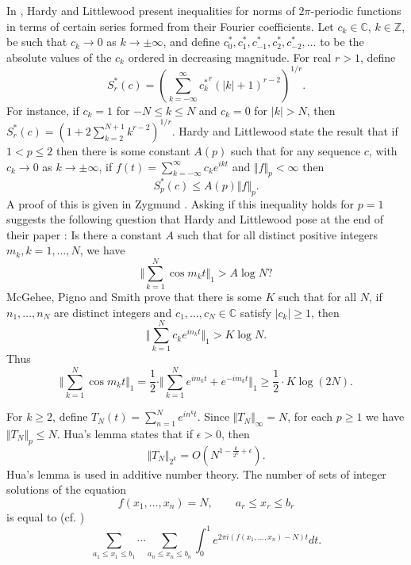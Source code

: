 \documentclass{article}
\newcommand{\norm}[1]{\Vert #1 \Vert}
\begin{document}
In \cite{MR0028445}, Hardy and Littlewood present inequalities for norms of $2\pi$-periodic functions in terms of certain series
formed from their Fourier coefficients. Let $c_k \in \mathbb{C}$, $k \in \mathbb{Z}$, be such that $c_k \to 0$ as $k \to \pm \infty$, and
define
  $c_0^*,c_1^*,c_{-1}^*,c_2^*,c_{-2}^*,\ldots$
to be the absolute values of the $c_k$ ordered in decreasing magnitude. For real $r>1$, define
\[
S_r^*(c)=\left( \sum_{k=-\infty}^\infty {c_k^*}^r (|k|+1)^{r-2} \right)^{1/r}.
\]
For instance, if $c_k=1$ for $-N \leq k \leq N$ and $c_k=0$ for $|k|>N$, then $S_r^*(c)=\left(1+2\sum_{k=2}^{N+1} k^{r-2} \right)^{1/r}$. 
Hardy and Littlewood state the result \cite[p.~164, Theorem 2]{MR0028445} that if $1<p \leq 2$ then there is some constant $A(p)$ such that for any sequence $c$, with $c_k \to 0$ as $k \to \pm \infty$,
if $f(t)=\sum_{k=-\infty}^\infty c_k e^{ikt}$ and $\norm{f}_p < \infty$ then
\[
S_p^*(c) \leq A(p)\norm{f}_p.
\]
A proof of this is given in Zygmund \cite[vol.~II, p.~128, chap.~XII, Theorem~6.3]{zygmund}.
Asking if this inequality holds for $p=1$ suggests the following question that Hardy and Littlewood pose at the end of their paper \cite[p.~168]{MR0028445}: Is there a constant $A$ such that
for all distinct positive integers $m_k, k=1,\ldots,N$, we have
\[
\norm{\sum_{k=1}^N \cos m_k t}_1 > A \log N?
\]
McGehee, Pigno and Smith \cite{MR621019} prove that there is some $K$ such that for all $N$, if
$n_1,\ldots,n_N$ are distinct integers and $c_1,\ldots,c_N \in \mathbb{C}$ satisfy $|c_k| \geq 1$, then
\[
\norm{\sum_{k=1}^N c_k e^{in_k t}}_1 > K \log N.
\]
Thus
\[
\norm{\sum_{k=1}^N \cos m_k t}_1 =\frac{1}{2}\cdot \norm{\sum_{k=1}^N e^{im_kt}+e^{-im_kt}}_1
\geq \frac{1}{2}\cdot K\log(2N).
\]





For $k \geq 2$, define $T_N(t)=\sum_{n=1}^N e^{in^k t}$. Since $\norm{T_N}_\infty=N$, for each $p \geq 1$ we have $\norm{T_N}_p \leq N$.  Hua's lemma \cite[p.~116, Theorem~4.6]{nathanson} states that if $\epsilon>0$, then 
\[
\norm{T_N}_{2^k}=O\left( N^{1-\frac{k}{2^k}+\epsilon} \right).
\]
Hua's lemma is used in additive number theory. The number of sets of integer solutions of the equation
\[
f(x_1,\ldots,x_n)=N, \qquad a_r \leq x_r \leq b_r
\]
is equal to (cf. \cite[p.~151]{hua})
\[
\sum_{a_1 \leq x_1 \leq b_1} \cdots \sum_{a_n \leq x_n \leq b_n} \int_0^1 e^{2\pi i(f(x_1,\ldots,x_n)-N)t} dt.
\]
\end{document}
